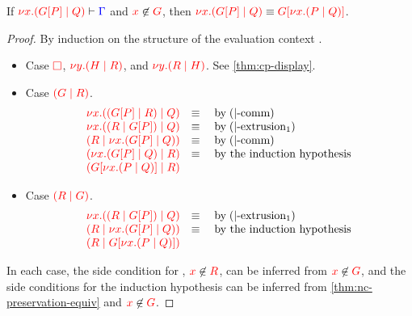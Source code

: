 \begin{lemma}\label{thm:nc-display-1}
  If $\seq[{ \tm{\cpCut{x}{\cpPlug{G}{P}}{Q}} }]{ \Gamma }$ and
  $\notFreeIn{x}{G}$, then $\tm{\cpCut{x}{\cpPlug{G}{P}}{Q}} \equiv
  \tm{\cpPlug{G}{\cpCut{x}{P}{Q}}}$.
\end{lemma}
\begin{proof}
  By induction on the structure of the evaluation context .
  \begin{itemize}
  \item
    Case $\tm{\Box}$, $\tm{\cpCut{y}{H}{R}}$, and $\tm{\cpCut{y}{R}{H}}$. See \cref{thm:cp-display}.
  \item
    Case $\tm{\ncPool{G}{R}}$.
    \[\!
      \begin{array}{ll}
        \tm{\cpCut{x}{\ncPool{\cpPlug{G}{P}}{R}}{Q}} & \equiv \quad \text{by} \; \ncEquivPoolComm \\
        \tm{\cpCut{x}{\ncPool{R}{\cpPlug{G}{P}}}{Q}} & \equiv \quad \text{by} \; \ncRedKappaPool1 \\
        \tm{\ncPool{R}{\cpCut{x}{\cpPlug{G}{P}}{Q}}} & \equiv \quad \text{by} \; \ncEquivPoolComm \\
        \tm{\ncPool{\cpCut{x}{\cpPlug{G}{P}}{Q}}{R}} & \equiv \quad \text{by the induction hypothesis}\\
        \tm{\ncPool{\cpPlug{G}{\cpCut{x}{P}{Q}}}{R}} &
      \end{array}
    \]
  \item
    Case $\tm{\ncPool{R}{G}}$.
    \[\!
      \begin{array}{ll}
        \tm{\cpCut{x}{\ncPool{R}{\cpPlug{G}{P}}}{Q}} & \equiv \quad \text{by} \; \ncRedKappaPool1 \\
        \tm{\ncPool{R}{\cpCut{x}{\cpPlug{G}{P}}{Q}}} & \equiv \quad \text{by the induction hypothesis}\\
        \tm{\ncPool{R}{\cpPlug{G}{\cpCut{x}{P}{Q}}}} &
      \end{array}
    \]
  \end{itemize}
  In each case, the side condition for , $\notFreeIn{x}{R}$, can
  be inferred from $\notFreeIn{x}{G}$, and the side conditions for the induction
  hypothesis can be inferred from \cref{thm:nc-preservation-equiv} and
  $\notFreeIn{x}{G}$.
\end{proof}
